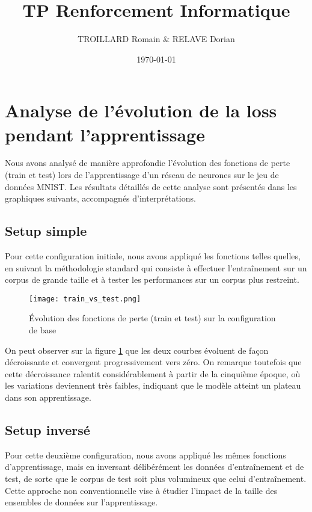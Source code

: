 \documentclass{article}
\title{\textbf{TP Renforcement Informatique}}
\author{TROILLARD Romain \& RELAVE Dorian}
\date{\today}
\begin{document}
\maketitle

\tableofcontents

\newpage

\section{Analyse de l'évolution de la loss pendant l'apprentissage}

Nous avons analysé de manière approfondie l'évolution des fonctions de perte (train et test) lors de l'apprentissage d'un réseau de neurones sur le jeu de données MNIST. Les résultats détaillés de cette analyse sont présentés dans les graphiques suivants, accompagnés d'interprétations.

\subsection{Setup simple}

Pour cette configuration initiale, nous avons appliqué les fonctions telles quelles, en suivant la méthodologie standard qui consiste à effectuer l'entraînement sur un corpus de grande taille et à tester les performances sur un corpus plus restreint.

\begin{figure}[H]
    \centering
    \texttt{[image: train\_vs\_test.png]}
    \caption{Évolution des fonctions de perte (train et test) sur la configuration de base}
    \label{fig:train_vs_test}
\end{figure}

On peut observer sur la figure \ref{fig:train_vs_test} que les deux courbes évoluent de façon décroissante et convergent progressivement vers zéro. On remarque toutefois que cette décroissance ralentit considérablement à partir de la cinquième époque, où les variations deviennent très faibles, indiquant que le modèle atteint un plateau dans son apprentissage.

\newpage
\subsection{Setup inversé}

Pour cette deuxième configuration, nous avons appliqué les mêmes fonctions d'apprentissage, mais en inversant délibérément les données d'entraînement et de test, de sorte que le corpus de test soit plus volumineux que celui d'entraînement. Cette approche non conventionnelle vise à étudier l'impact de la taille des ensembles de données sur l'apprentissage.
\end{document}
